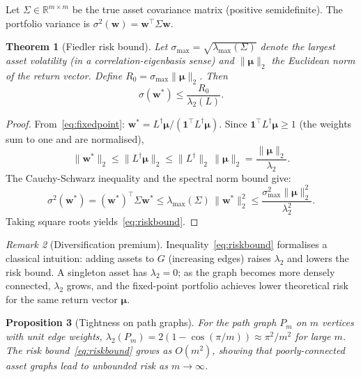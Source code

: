 \documentclass[twocolumn,11pt,a4paper]{article}
\newtheorem{theorem}{Theorem}[section]
\newtheorem{proposition}[theorem]{Proposition}
\theoremstyle{remark}
\newtheorem{remark}[theorem]{Remark}
\newcommand{\R}{\mathbb{R}}
\newcommand{\one}{\mathbf{1}}
\newcommand{\bw}{\mathbf{w}}
\newcommand{\bmu}{\bm{\mu}}
\newcommand{\Ld}{L^\dagger}
\newcommand{\lam}[1]{\lambda_{#1}}
\newcommand{\sigtwo}{\sigma^2}
\begin{document}
Let $\Sigma\in\R^{m\times m}$ be the true asset covariance matrix (positive semidefinite).
The portfolio variance is $\sigtwo(\bw) = \bw^\top\Sigma\bw$.

\begin{theorem}[Fiedler risk bound]
\label{thm:risk}
Let $\sigma_{\max} = \sqrt{\lambda_{\max}(\Sigma)}$ denote the largest asset
volatility (in a correlation-eigenbasis sense) and $\|\bmu\|_2$ the Euclidean
norm of the return vector. Define $R_0 = \sigma_{\max}\|\bmu\|_2$. Then
\begin{equation}
  \sigma(\bw^*) \leq \frac{R_0}{\lam{2}(L)}.
  \label{eq:riskbound}
\end{equation}
\end{theorem}

\begin{proof}
From~\eqref{eq:fixedpoint}: $\bw^* = \Ld\bmu/(\one^\top\Ld\bmu)$.
Since $\one^\top\Ld\bmu \geq 1$ (the weights sum to one and are normalised),
\begin{equation}
  \|\bw^*\|_2 \leq \|\Ld\bmu\|_2 \leq \|\Ld\|_2\,\|\bmu\|_2 = \frac{\|\bmu\|_2}{\lam{2}}.
\end{equation}
The Cauchy-Schwarz inequality and the spectral norm bound give:
\begin{equation}
  \sigtwo(\bw^*) = (\bw^*)^\top\Sigma\bw^* \leq \lambda_{\max}(\Sigma)\,\|\bw^*\|_2^2
  \leq \frac{\sigma_{\max}^2\|\bmu\|_2^2}{\lam{2}^2}.
\end{equation}
Taking square roots yields~\eqref{eq:riskbound}.
\end{proof}

\begin{remark}[Diversification premium]
Inequality~\eqref{eq:riskbound} formalises a classical intuition:
adding assets to $G$ (increasing edges) raises $\lam{2}$ and lowers the
risk bound. A singleton asset has $\lam{2} = 0$; as the graph becomes
more densely connected, $\lam{2}$ grows, and the fixed-point portfolio
achieves lower theoretical risk for the same return vector $\bmu$.
\end{remark}

\begin{proposition}[Tightness on path graphs]
\label{prop:tightness}
For the path graph $P_m$ on $m$ vertices with unit edge weights,
$\lam{2}(P_m) = 2(1-\cos(\pi/m)) \approx \pi^2/m^2$ for large $m$.
The risk bound~\eqref{eq:riskbound} grows as $O(m^2)$, showing that
poorly-connected asset graphs lead to unbounded risk as $m\to\infty$.
\end{proposition}
\end{document}
